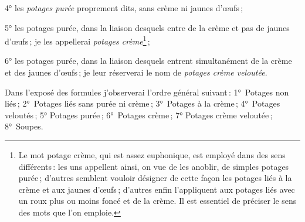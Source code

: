 4° les \textit{potages purée} proprement dits, sans crème ni jaunes d'œufs ;

5° les potages purée, dans la liaison desquels entre de la crème et pas de
jaunes d'œufs ; je les appellerai \textit{potages crème}\footnote{Le mot
potage crème, qui est assez euphonique, est employé dans des sens différents :
les uns appellent ainsi, on vue de les anoblir, de simples potages purée ;
d'autres semblent vouloir désigner de cette façon les potages liés à la crème
et aux jaunes d'œufs ; d'autres enfin l'appliquent aux potages liés avec un roux
plus ou moins foncé et de la crème. Il est essentiel de préciser le sens des
mots que l'on emploie.} ;

6° les potages purée, dans la liaison desquels entrent simultanément de la
crème et des jaunes d'œufs ; je leur réserverai le nom de \textit{potages crème
veloutée}.

Dans l'exposé des formules j'observerai l'ordre général suivant : 1° Potages
non liés ; 2° Potages liés sans purée ni crème ; 3° Potages à la crème ;
4° Potages veloutés ; 5° Potages purée ; 6° Potages crème ; 7° Potages crème
veloutée ; 8° Soupes.
